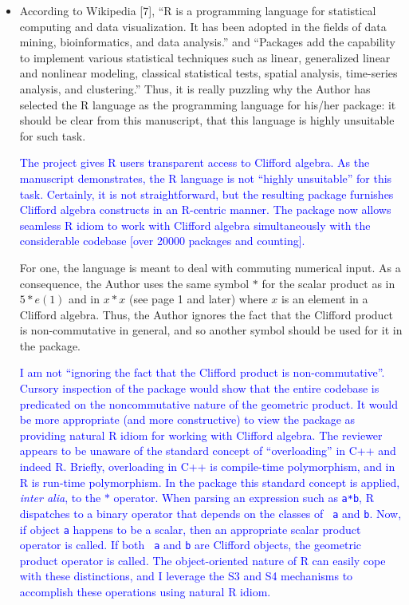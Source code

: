 \documentclass{article}
\begin{document}
\begin{itemize}
\item According to Wikipedia [7], “R is a programming language for statistical computing and
data visualization. It has been adopted in the fields of data mining, bioinformatics, and data
analysis.” and “Packages add the capability to implement various statistical techniques such
as linear, generalized linear and nonlinear modeling, classical statistical tests, spatial analysis,
time-series analysis, and clustering.”
Thus, it is really puzzling why the Author has selected the R language as the programming
language for his/her package: it should be clear from this manuscript, that this language is
highly unsuitable for such task.

\textcolor{blue}{The project gives R users transparent access to
  Clifford algebra.  As the manuscript demonstrates, the R language is
  not ``highly unsuitable'' for this task.  Certainly, it is not
  straightforward, but the resulting package furnishes Clifford
  algebra constructs in an R-centric manner.  The package now allows
  seamless R idiom to work with Clifford algebra simultaneously with
  the considerable codebase [over 20000 packages and counting].}

For one, the language is meant to deal with commuting numerical
input. As a consequence, the Author uses the same symbol $*$ for the
scalar product as in $5* e(1)$ and in $x * x$ (see page 1 and later)
where $x$ is an element in a Clifford algebra.  Thus, the Author
ignores the fact that the Clifford product is non-commutative in
general, and so another symbol should be used for it in the package.

\textcolor{blue}{I am not ``ignoring the fact that the Clifford
  product is non-commutative''.  Cursory inspection of the package
  would show that the entire codebase is predicated on the
  noncommutative nature of the geometric product.  It would be more
  appropriate (and more constructive) to view the package as providing
  natural R idiom for working with Clifford algebra.  The reviewer
  appears to be unaware of the standard concept of ``overloading'' in
  C++ and indeed R.  Briefly, overloading in C++ is compile-time
  polymorphism, and in R is run-time polymorphism.  In the package
  this standard concept is applied, {\em inter alia}, to the $*$
  operator.  When parsing an expression such as {\tt a*b}, R
  dispatches to a binary operator that depends on the classes of {\tt
    a} and {\tt b}.  Now, if object {\tt a} happens to be a scalar,
  then an appropriate scalar product operator is called.  If both {\tt
    a} and {\tt b} are Clifford objects, the geometric product
  operator is called.  The object-oriented nature of R can easily cope
  with these distinctions, and I leverage the S3 and S4 mechanisms to
  accomplish these operations using natural R idiom.}


\end{itemize}
\end{document}
